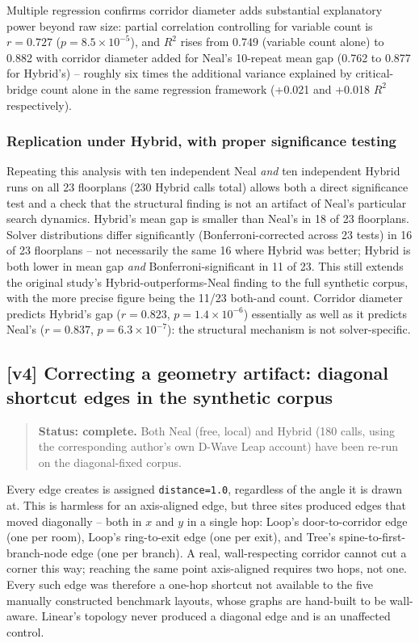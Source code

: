 \documentclass[11pt]{article}
\begin{document}
Multiple regression confirms corridor diameter adds substantial explanatory power beyond raw size: partial correlation controlling for variable count is $r=0.727$ ($p=8.5\times10^{-5}$), and $R^2$ rises from 0.749 (variable count alone) to 0.882 with corridor diameter added for Neal's 10-repeat mean gap (0.762 to 0.877 for Hybrid's) -- roughly six times the additional variance explained by critical-bridge count alone in the same regression framework (+0.021 and +0.018 $R^2$ respectively).

\subsubsection{Replication under Hybrid, with proper significance testing}
Repeating this analysis with ten independent Neal \emph{and} ten independent Hybrid runs on all 23 floorplans (230 Hybrid calls total) allows both a direct significance test and a check that the structural finding is not an artifact of Neal's particular search dynamics. Hybrid's mean gap is smaller than Neal's in 18 of 23 floorplans. Solver distributions differ significantly (Bonferroni-corrected across 23 tests) in 16 of 23 floorplans -- not necessarily the same 16 where Hybrid was better; Hybrid is both lower in mean gap \emph{and} Bonferroni-significant in 11 of 23. This still extends the original study's Hybrid-outperforms-Neal finding to the full synthetic corpus, with the more precise figure being the 11/23 both-and count. Corridor diameter predicts Hybrid's gap ($r=0.823$, $p=1.4\times10^{-6}$) essentially as well as it predicts Neal's ($r=0.837$, $p=6.3\times10^{-7}$): the structural mechanism is not solver-specific.

\subsection{\textbf{[v4]} Correcting a geometry artifact: diagonal shortcut edges in the synthetic corpus}
\label{sec:v4-diagonal}

\begin{quote}
\textbf{Status: complete.} Both Neal (free, local) and Hybrid (180 calls, using the corresponding author's own D-Wave Leap account) have been re-run on the diagonal-fixed corpus.
\end{quote}

Every edge  creates is assigned \texttt{distance=1.0}, regardless of the angle it is drawn at. This is harmless for an axis-aligned edge, but three sites produced edges that moved diagonally -- both in $x$ and $y$ in a single hop: Loop's door-to-corridor edge (one per room), Loop's ring-to-exit edge (one per exit), and Tree's spine-to-first-branch-node edge (one per branch). A real, wall-respecting corridor cannot cut a corner this way; reaching the same point axis-aligned requires two hops, not one. Every such edge was therefore a one-hop shortcut not available to the five manually constructed benchmark layouts, whose graphs are hand-built to be wall-aware. Linear's topology never produced a diagonal edge and is an unaffected control.
\end{document}
